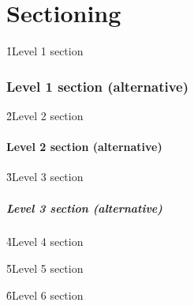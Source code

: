 \part{Sectioning}

\h1{Level 1 section}

\section{Level 1 section (alternative)}

\h2{Level 2 section}

\subsection{Level 2 section (alternative)}

\h3{Level 3 section}

\subsubsection{Level 3 section (alternative)}

\h4{Level 4 section}

\h5{Level 5 section}

\h6{Level 6 section}

